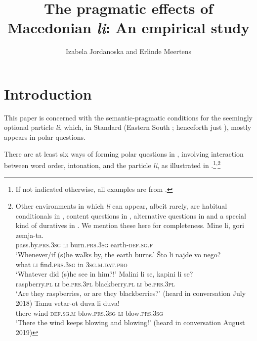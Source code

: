 \documentclass[output=paper]{langscibook}
\author{Izabela Jordanoska\affiliation{University of Vienna} and Erlinde Meertens\affiliation{University of Konstanz}}
\title[The pragmatic effects of Macedonian \textup{li}: An empirical study]
      {The pragmatic effects of Macedonian \textit{li}: An empirical study}
\begin{document}
\maketitle

\section{Introduction}

This paper is concerned with the semantic-pragmatic conditions for the seemingly optional particle \textit{li}, which, in Standard  (Eastern South ; henceforth just ), mostly appears in polar questions.

There are at least six ways of forming polar questions in , involving interaction between word order, intonation, and the particle \textit{li}, as illustrated in .\footnote{If not indicated otherwise, all examples are from .}\textsuperscript{,}\footnote{Other environments in which \textit{li} can appear, albeit rarely, are habitual conditionals in , content questions in , alternative questions in  and a special kind of duratives in . We mention these here for completeness.
\ea
\ea \gll Mine li, gori zemja-ta.\\
    pass.by.\textsc{prs.3sg} \textsc{li} burn.\textsc{prs.3sg} earth-\textsc{def.sg.f}\\
    \glt `Whenever/if (s)he walks by, the earth burns.' \label{cond} \hfill  \citep[539]{koneski1987}
        \ex \gll Što li najde vo nego? \\
what \textsc{li} find.\textsc{prs.3sg} in \textsc{3sg.m.dat.pro} \\
\glt `Whatever did (s)he see in him?!' \label{sto} \hfill  \citep[561]{Rudin.Kramer.Billings.Baerman1999}
        \ex  \gll Malini li se, kapini li se? \\
raspberry.\textsc{pl} \textsc{li} be.\textsc{prs.3pl} blackberry.\textsc{pl} \textsc{li} be.\textsc{prs.3pl} \\
\glt `Are they raspberries, or are they blackberries?' \label{altq}  \hfill  (heard in conversation July 2018)
        \ex \gll Tamu vetar-ot duva li duva! \\
there wind-\textsc{def.sg.m} blow.\textsc{prs.3sg} \textsc{li} blow.\textsc{prs.3sg} \\ \glt
`There the wind keeps blowing and blowing!'  \label{dur} \hfill (heard in conversation August 2019)

\z\z}
\end{document}
